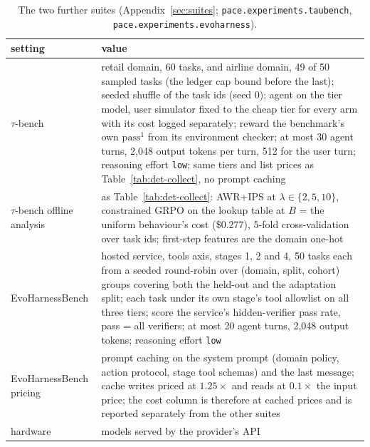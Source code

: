 \documentclass[10pt]{article}
\newcommand{\code}[1]{\texttt{#1}}
\begin{document}
\begin{table}[H]
\centering\footnotesize
\caption{The two further suites (Appendix~\ref{sec:suites}; \code{pace.experiments.taubench}, \code{pace.experiments.evoharness}).}
\label{tab:det-suites}
\begin{tabular}{p{4.0cm}p{11.6cm}}
\toprule
setting & value \\
\midrule
$\tau$-bench & retail domain, 60 tasks, and airline domain, 49 of 50 sampled tasks (the ledger cap bound before the last); seeded shuffle of the task ids (seed 0); agent on the tier model, user simulator fixed to the cheap tier for every arm with its cost logged separately; reward the benchmark's own $\mathrm{pass}^1$ from its environment checker; at most 30 agent turns, 2{,}048 output tokens per turn, 512 for the user turn; reasoning effort \code{low}; same tiers and list prices as Table~\ref{tab:det-collect}, no prompt caching \\
$\tau$-bench offline analysis & as Table~\ref{tab:det-collect}: AWR+IPS at $\lambda\in\{2,5,10\}$, constrained GRPO on the lookup table at $B$ = the uniform behaviour's cost (\$0.277), 5-fold cross-validation over task ids; first-step features are the domain one-hot \\
EvoHarnessBench & hosted service, tools axis, stages 1, 2 and 4, 50 tasks each from a seeded round-robin over (domain, split, cohort) groups covering both the held-out and the adaptation split; each task under its own stage's tool allowlist on all three tiers; score the service's hidden-verifier pass rate, pass = all verifiers; at most 20 agent turns, 2{,}048 output tokens; reasoning effort \code{low} \\
EvoHarnessBench pricing & prompt caching on the system prompt (domain policy, action protocol, stage tool schemas) and the last message; cache writes priced at $1.25\times$ and reads at $0.1\times$ the input price; the cost column is therefore at cached prices and is reported separately from the other suites \\
hardware & models served by the provider's API \\
\bottomrule
\end{tabular}
\end{table}
\end{document}

